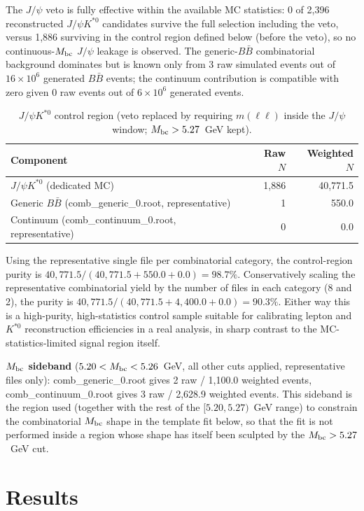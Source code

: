 \documentclass[11pt]{article}
\begin{document}
The $J/\psi$ veto is fully effective within the available MC
statistics: 0 of 2,396 reconstructed $J/\psi K^{*0}$ candidates survive
the full selection including the veto, versus 1,886 surviving in the
control region defined below (before the veto), so no continuous-$M_{\rm bc}$
$J/\psi$ leakage is observed. The generic-$B\bar B$ combinatorial
background dominates but is known only from 3 raw simulated events out
of $16\times10^6$ generated $B\bar B$ events; the continuum contribution
is compatible with zero given 0 raw events out of $6\times10^6$
generated events.

\begin{table}[H]
\centering
\caption{$J/\psi K^{*0}$ control region (veto replaced by requiring $m(\ell\ell)$ inside the $J/\psi$ window; $M_{\rm bc}>5.27$~GeV kept).}
\begin{tabular}{lrr}
\toprule
Component & Raw $N$ & Weighted $N$ \\
\midrule
$J/\psi K^{*0}$ (dedicated MC) & 1,886 & 40,771.5 \\
Generic $B\bar B$ (comb\_generic\_0.root, representative) & 1 & 550.0 \\
Continuum (comb\_continuum\_0.root, representative) & 0 & 0.0 \\
\bottomrule
\end{tabular}
\end{table}

Using the representative single file per combinatorial category, the
control-region purity is $40{,}771.5/(40{,}771.5+550.0+0.0)=98.7\%$.
Conservatively scaling the representative combinatorial yield by the
number of files in each category (8 and 2), the purity is
$40{,}771.5/(40{,}771.5+4{,}400.0+0.0)=90.3\%$. Either way this is a
high-purity, high-statistics control sample suitable for calibrating
lepton and $K^{*0}$ reconstruction efficiencies in a real analysis, in
sharp contrast to the MC-statistics-limited signal region itself.

\textbf{$M_{\rm bc}$ sideband} ($5.20<M_{\rm bc}<5.26$~GeV, all other
cuts applied, representative files only): comb\_generic\_0.root gives 2
raw / 1,100.0 weighted events, comb\_continuum\_0.root gives 3 raw /
2,628.9 weighted events. This sideband is the region used (together
with the rest of the $[5.20,5.27)$~GeV range) to constrain the
combinatorial $M_{\rm bc}$ shape in the template fit below, so that the
fit is not performed inside a region whose shape has itself been
sculpted by the $M_{\rm bc}>5.27$~GeV cut.

\section{Results}
\label{sec:results}
\end{document}
